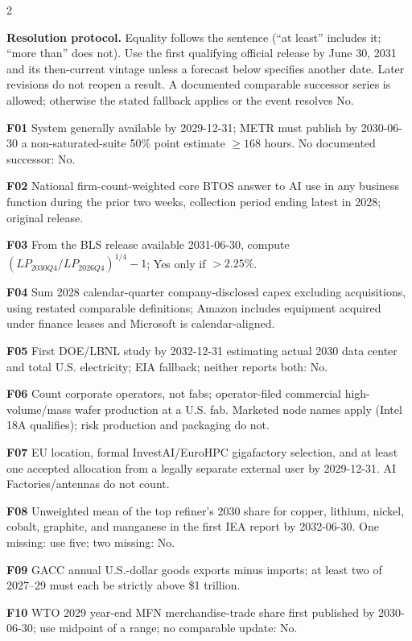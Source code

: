 \documentclass[10pt,letterpaper]{article}
\begin{document}
{\fontsize{8.0}{9.3}\selectfont
\begin{multicols}{2}
\raggedcolumns

\textbf{\color{accent}Resolution protocol.} Equality follows the sentence
(``at least'' includes it; ``more than'' does not). Use the first qualifying
official release by June 30, 2031 and its then-current vintage unless a
forecast below specifies another date. Later revisions do not reopen a result.
A documented comparable successor series is allowed; otherwise the stated
fallback applies or the event resolves No.

\textbf{F01} System generally available by 2029-12-31; METR must publish by
2030-06-30 a non-saturated-suite 50\% point estimate $\geq168$ hours. No
documented successor: No.

\textbf{F02} National firm-count-weighted core BTOS answer to AI use in any
business function during the prior two weeks, collection period ending latest
in 2028; original release.

\textbf{F03} From the BLS release available 2031-06-30, compute
$(LP_{2030Q4}/LP_{2026Q4})^{1/4}-1$; Yes only if $>2.25\%$.

\textbf{F04} Sum 2028 calendar-quarter company-disclosed capex excluding
acquisitions, using restated comparable definitions; Amazon includes equipment
acquired under finance leases and Microsoft is calendar-aligned.

\textbf{F05} First DOE/LBNL study by 2032-12-31 estimating actual 2030 data
center and total U.S. electricity; EIA fallback; neither reports both: No.

\textbf{F06} Count corporate operators, not fabs; operator-filed commercial
high-volume/mass wafer production at a U.S. fab. Marketed node names apply
(Intel 18A qualifies); risk production and packaging do not.

\textbf{F07} EU location, formal InvestAI/EuroHPC gigafactory selection, and at
least one accepted allocation from a legally separate external user by
2029-12-31. AI Factories/antennas do not count.

\textbf{F08} Unweighted mean of the top refiner's 2030 share for copper,
lithium, nickel, cobalt, graphite, and manganese in the first IEA report by
2032-06-30. One missing: use five; two missing: No.

\textbf{F09} GACC annual U.S.-dollar goods exports minus imports; at least two
of 2027--29 must each be strictly above \$1 trillion.

\textbf{F10} WTO 2029 year-end MFN merchandise-trade share first published by
2030-06-30; use midpoint of a range; no comparable update: No.


\end{multicols}}
\end{document}
